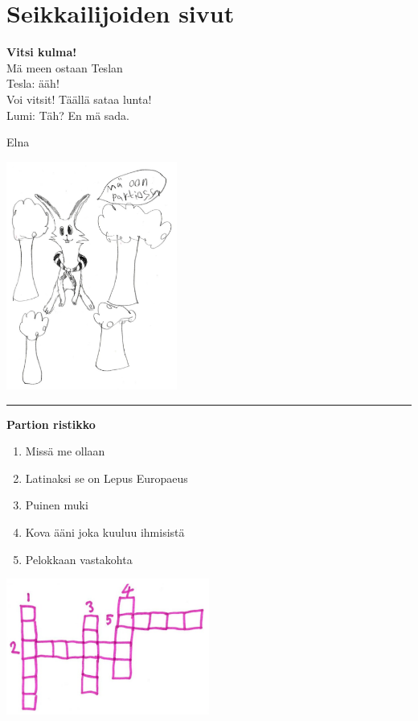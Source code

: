 
\section{Seikkailijoiden sivut}\label{sec:seikkailijat}


\vspace*{-0.32cm}
\begin{multicols}{2}
\noindent \textbf{Vitsi kulma!\\}
\bigskip
Mä meen ostaan Teslan\\
Tesla: ääh!\\
\bigskip
Voi vitsit! Täällä sataa lunta!\\
Lumi: Täh? En mä sada.

\vfill
\noindent Elna

\columnbreak
\includegraphics[width=0.42\textwidth]{assets/seikkailijat2}
\end{multicols}

\hrule

\begin{multicols}{2}
\noindent\textbf{Partion ristikko}
\begin{enumerate}
	\item Missä me ollaan
	\item Latinaksi se on Lepus Europaeus
	\item Puinen muki
	\item Kova ääni joka kuuluu ihmisistä
	\item Pelokkaan vastakohta
\end{enumerate}
\columnbreak
\includegraphics[width=0.5\textwidth]{assets/seikkailijat1}
\end{multicols}


